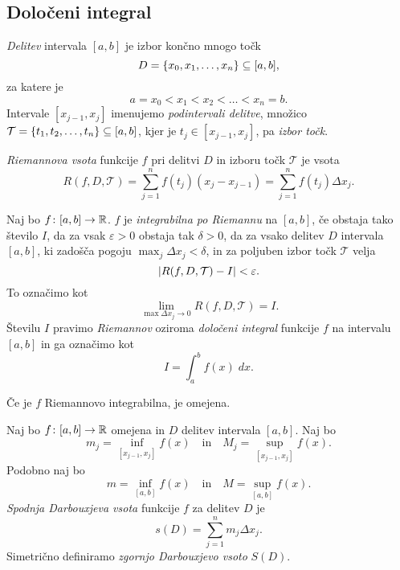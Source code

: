 \documentclass[12pt, a4paper]{article}
\begin{document}
\newpage

\subsection{Določeni integral}

\begin{definicija}
\emph{Delitev} intervala $[a,b]$ je izbor končno mnogo točk
\[
D=\left\{x_0,x_1,\dots,x_n\right\}\subseteq[a,b],
\]
za katere je
\[
a=x_0<x_1<x_2<\dots<x_n=b.
\]
Intervale $[x_{j-1},x_j]$ imenujemo \emph{podintervali delitve}, množico $\mathcal{T}=\left\{t_1,t_2,\dots,t_n\right\}\subseteq[a,b]$, kjer je $t_j\in[x_{j-1},x_j]$, pa \emph{izbor točk}.
\end{definicija}

\begin{definicija}
\emph{Riemannova vsota} funkcije $f$ pri delitvi $D$ in izboru točk $\mathcal{T}$ je vsota
\[
R(f,D,\mathcal{T})=\sum_{j=1}^n f(t_j)(x_j-x_{j-1})=\sum_{j=1}^n f(t_j)\Delta x_j.
\]
\end{definicija}

\begin{okvir}
\begin{definicija}
Naj bo $f\colon[a,b]\to\mathbb{R}$. $f$ je \emph{integrabilna po Riemannu} na $[a,b]$, če obstaja tako število $I$, da za vsak $\varepsilon>0$ obstaja tak $\delta>0$, da za vsako delitev $D$ intervala $[a,b]$, ki zadošča pogoju $\displaystyle\max_{j}\Delta x_j<\delta$, in za poljuben izbor točk $\mathcal{T}$ velja
\[
\left\lvert R(f,D,\mathcal{T})-I\right\rvert<\varepsilon.
\]
To označimo kot
\[
\lim_{\max \Delta x_j\to 0} R(f,D,\mathcal{T})=I.
\]
Številu $I$ pravimo \emph{Riemannov} oziroma \emph{določeni integral} funkcije $f$ na intervalu $[a,b]$ in ga označimo kot
\[
I=\int_a^b f(x)\;dx.
\]
\end{definicija}
\end{okvir}

\begin{opomba}
Če je $f$ Riemannovo integrabilna, je omejena.
\end{opomba}

\begin{definicija}
Naj bo $f\colon[a,b]\to\mathbb{R}$ omejena in $D$ delitev intervala $[a,b]$. Naj bo 
\[
m_j=\inf_{[x_{j-1},x_j]} f(x)\quad\text{in}\quad M_j=\sup_{[x_{j-1},x_j]} f(x).
\]
Podobno naj bo
\[
m=\inf_{[a,b]} f(x)\quad\text{in}\quad M=\sup_{[a,b]} f(x).
\]
\emph{Spodnja Darbouxjeva vsota} funkcije $f$ za delitev $D$ je
\[
s(D)=\sum_{j=1}^n m_j\Delta x_j.
\]
Simetrično definiramo \emph{zgornjo Darbouxjevo vsoto} $S(D)$.
\end{definicija}
\end{document}
